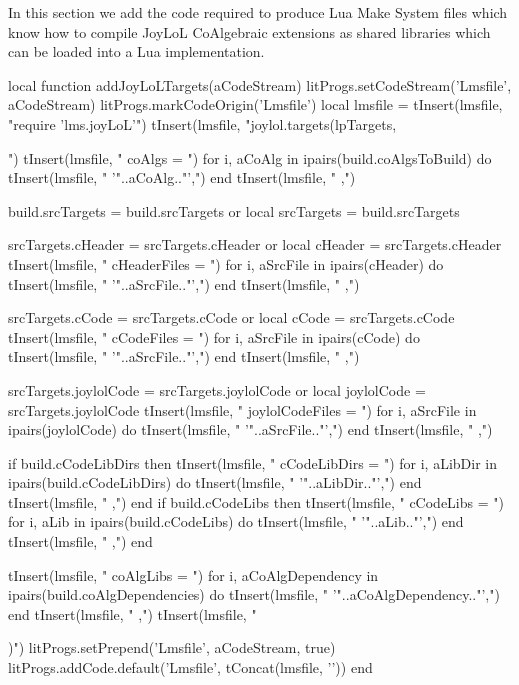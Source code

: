 In this section we add the code required to produce Lua Make System files 
which know how to compile JoyLoL CoAlgebraic extensions as shared 
libraries which can be loaded into a Lua implementation. 

\startMkIVCode
\def\addJoyLoLTargets#1{%
  \directlua{
    thirddata.joylolCoAlgs.addJoyLoLTargets('#1')
  }
}
\stopMkIVCode

\startLuaCode
local function addJoyLoLTargets(aCodeStream)
  litProgs.setCodeStream('Lmsfile', aCodeStream)
  litProgs.markCodeOrigin('Lmsfile')
  local lmsfile = {}
  tInsert(lmsfile, "require 'lms.joyLoL'\n")
  tInsert(lmsfile, "joylol.targets(lpTargets, {")
  tInsert(lmsfile, "  coAlgs = {")
  for i, aCoAlg in ipairs(build.coAlgsToBuild) do
    tInsert(lmsfile, "    '"..aCoAlg.."',")
  end
  tInsert(lmsfile, "  },")
  
  build.srcTargets = build.srcTargets or { }
  local srcTargets = build.srcTargets
  
  srcTargets.cHeader = srcTargets.cHeader or { }
  local cHeader      = srcTargets.cHeader
  tInsert(lmsfile, "  cHeaderFiles = {")
  for i, aSrcFile in ipairs(cHeader) do
    tInsert(lmsfile, "    '"..aSrcFile.."',")
  end
  tInsert(lmsfile, "  },")
  
  srcTargets.cCode = srcTargets.cCode or { }
  local cCode      = srcTargets.cCode
  tInsert(lmsfile, "  cCodeFiles = {")
  for i, aSrcFile in ipairs(cCode) do
    tInsert(lmsfile, "    '"..aSrcFile.."',")
  end
  tInsert(lmsfile, "  },")

  srcTargets.joylolCode = srcTargets.joylolCode or { }
  local joylolCode      = srcTargets.joylolCode
  tInsert(lmsfile, "  joylolCodeFiles = {")
  for i, aSrcFile in ipairs(joylolCode) do
    tInsert(lmsfile, "    '"..aSrcFile.."',")
  end
  tInsert(lmsfile, "  },")

  if build.cCodeLibDirs then 
    tInsert(lmsfile, "  cCodeLibDirs = {")
    for i, aLibDir in ipairs(build.cCodeLibDirs) do
      tInsert(lmsfile, "    '"..aLibDir.."',")
    end
    tInsert(lmsfile, "  },")
  end
  if build.cCodeLibs then 
    tInsert(lmsfile, "  cCodeLibs = {")
    for i, aLib in ipairs(build.cCodeLibs) do
      tInsert(lmsfile, "    '"..aLib.."',")
    end
    tInsert(lmsfile, "  },")
  end

  tInsert(lmsfile, "  coAlgLibs = {")
  for i, aCoAlgDependency in ipairs(build.coAlgDependencies) do
    tInsert(lmsfile, "    '"..aCoAlgDependency.."',")
  end
  tInsert(lmsfile, "  },")
  tInsert(lmsfile, "})")
  litProgs.setPrepend('Lmsfile', aCodeStream, true)
  litProgs.addCode.default('Lmsfile', tConcat(lmsfile, '\n'))
end


